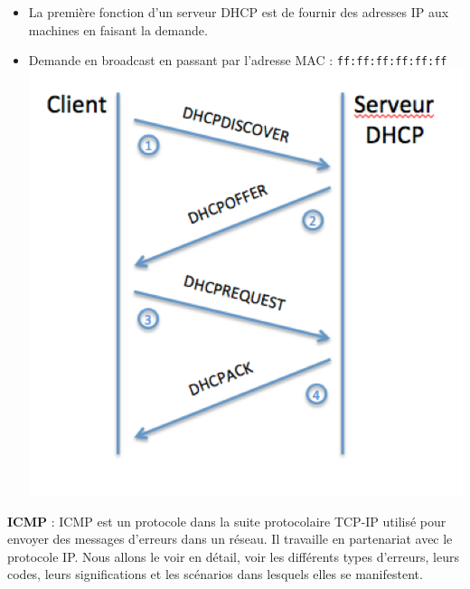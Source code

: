 \documentclass[a4paper,9pt, twocolumn]{article}
\begin{document}
\begin{itemize}
\item La première fonction d'un serveur DHCP est de fournir des adresses IP  aux machines en faisant la demande.
\item Demande en broadcast en passant par l'adresse MAC : \texttt{ff:ff:ff:ff:ff:ff}
\includegraphics[scale=0.4]{dhcp.png}
\end{itemize}
\textbf{ICMP} : ICMP est un protocole dans la suite protocolaire TCP-IP utilisé pour envoyer des messages d'erreurs dans un réseau. Il travaille en partenariat avec le protocole IP. Nous allons le voir en détail, voir les différents types d'erreurs, leurs codes, leurs significations et les scénarios dans lesquels elles se manifestent. 
\end{document}
